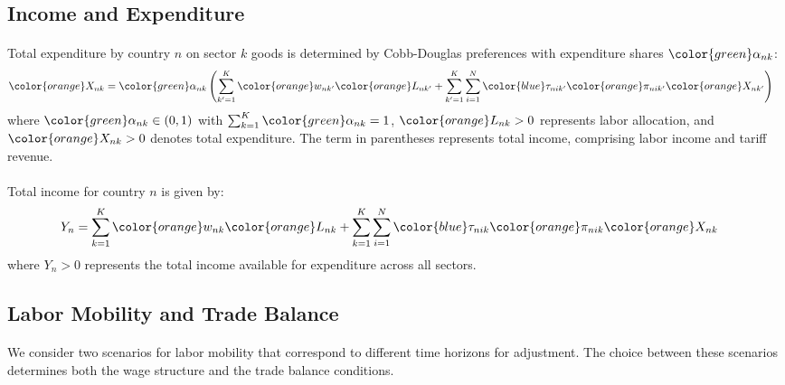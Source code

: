 \subsection{Income and Expenditure}

\paragraph{} Total expenditure by country $n$ on sector $k$ goods is determined by Cobb-Douglas preferences with expenditure shares ${\color{green}\alpha_{nk}}$:
\begin{align*}
   {\color{orange}X_{nk}} &= {\color{green}\alpha_{nk}} \left( \sum_{k'=1}^{K} {\color{orange}w_{nk'}} {\color{orange}L_{nk'}} + \sum_{k'=1}^{K} \sum_{i=1}^{N} {\color{blue}\tau_{nik'}} {\color{orange}\pi_{nik'}} {\color{orange}X_{nk'}} \right)
\end{align*}
where ${\color{green}\alpha_{nk}} \in (0,1)$ with $\sum_{k=1}^{K} {\color{green}\alpha_{nk}} = 1$, ${\color{orange}L_{nk}} > 0$ represents labor allocation, and ${\color{orange}X_{nk}} > 0$ denotes total expenditure. The term in parentheses represents total income, comprising labor income and tariff revenue.

\paragraph{} Total income for country $n$ is given by:
\begin{align*}
   Y_n &= \sum_{k=1}^{K} {\color{orange}w_{nk}} {\color{orange}L_{nk}} + \sum_{k=1}^{K} \sum_{i=1}^{N} {\color{blue}\tau_{nik}} {\color{orange}\pi_{nik}} {\color{orange}X_{nk}}
\end{align*}
where $Y_n > 0$ represents the total income available for expenditure across all sectors.

\subsection{Labor Mobility and Trade Balance}

\paragraph{} We consider two scenarios for labor mobility that correspond to different time horizons for adjustment. The choice between these scenarios determines both the wage structure and the trade balance conditions.

